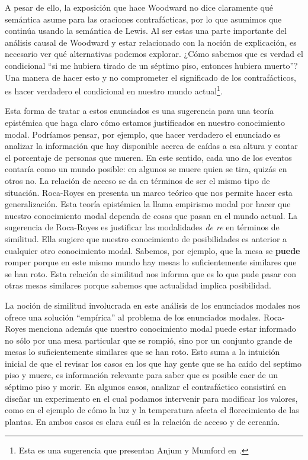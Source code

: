 A pesar de ello, la exposición que hace Woodward no dice claramente qué semántica asume para las oraciones contrafácticas, por lo que asumimos que continúa usando la semántica de Lewis. Al ser estas una parte importante del análisis causal de Woodward y estar relacionado con la noción de explicación, es necesario ver qué alternativas podemos explorar. ¿Cómo sabemos que es verdad el condicional ``si me hubiera tirado de un séptimo piso, entonces hubiera muerto''? Una manera de hacer esto y no comprometer el significado de los contrafácticos, es hacer verdadero el condicional en nuestro mundo actual\footnote{Esta es una sugerencia que presentan Anjum y Mumford en \cite{Mumford2013}.}.

Esta forma de tratar a estos enunciados es una sugerencia para una teoría epistémica que haga claro cómo estamos justificados en nuestro conocimiento modal. Podríamos pensar, por ejemplo, que hacer verdadero el enunciado es analizar la información que hay disponible acerca de caídas a esa altura y contar el porcentaje de personas que mueren. En este sentido, cada uno de los eventos contaría como un mundo posible: en algunos se muere quien se tira, quizás en otros no. La relación de acceso se da en términos de ser el mismo tipo de situación. Roca-Royes en \citeyear{rocaroyes} presenta un marco teórico que nos permite hacer esta generalización. Esta teoría epistémica la llama empirismo modal por hacer que nuestro conocimiento modal dependa de cosas que pasan en el mundo actual. La sugerencia de Roca-Royes es justificar las modalidades \textit{de re} en términos de similitud. Ella sugiere que nuestro conocimiento de posibilidades es anterior a cualquier otro conocimiento modal. Sabemos, por ejemplo, que la mesa se \textbf{puede} romper porque en este mismo mundo hay mesas lo suficientemente similares que se han roto. Esta relación de similitud nos informa que es lo que pude pasar con otras mesas similares porque sabemos que actualidad implica posibilidad.

La noción de similitud involucrada en este análisis de los enunciados modales nos ofrece una solución ``empírica'' al problema de los enunciados modales. Roca-Royes menciona además que nuestro conocimiento modal puede estar informado no sólo por una mesa particular que se rompió, sino por un conjunto grande de mesas lo suficientemente similares que se han roto. Esto suma a la intuición inicial de que el revisar los casos en los que hay gente que se ha caído del septimo piso y muere, es información relevante para saber que es posible caer de un séptimo piso y morir. En algunos casos, analizar el contrafáctico consistirá en diseñar un experimento en el cual podamos intervenir para modificar los valores, como en el ejemplo de cómo la luz y la temperatura afecta el florecimiento de las plantas. En ambos casos es clara cuál es la relación de acceso y de cercanía.


